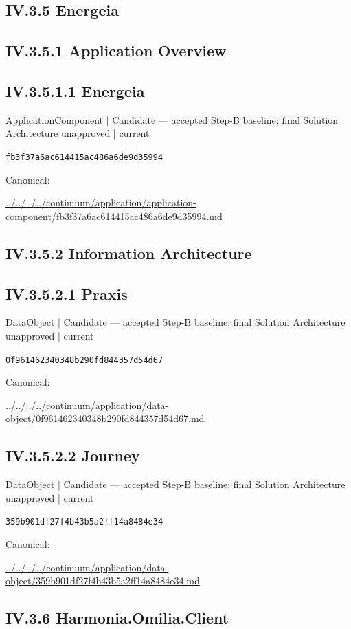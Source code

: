 \documentclass[10pt,a4paper]{article}
\begin{document}
\subsection*{IV.3.5 Energeia}
\subsection*{IV.3.5.1 Application Overview}
\subsection*{IV.3.5.1.1 Energeia}
{\small ApplicationComponent | Candidate — accepted Step-B baseline; final Solution Architecture unapproved | current}\par
\texttt{fb3f37a6ac614415ac486a6de9d35994}\par
Canonical: \par
{\footnotesize\url{../../../../continuum/application/application-component/fb3f37a6ac614415ac486a6de9d35994.md}}\par
\subsection*{IV.3.5.2 Information Architecture}
\subsection*{IV.3.5.2.1 Praxis}
{\small DataObject | Candidate — accepted Step-B baseline; final Solution Architecture unapproved | current}\par
\texttt{0f961462340348b290fd844357d54d67}\par
Canonical: \par
{\footnotesize\url{../../../../continuum/application/data-object/0f961462340348b290fd844357d54d67.md}}\par
\subsection*{IV.3.5.2.2 Journey}
{\small DataObject | Candidate — accepted Step-B baseline; final Solution Architecture unapproved | current}\par
\texttt{359b901df27f4b43b5a2ff14a8484e34}\par
Canonical: \par
{\footnotesize\url{../../../../continuum/application/data-object/359b901df27f4b43b5a2ff14a8484e34.md}}\par
\subsection*{IV.3.6 Harmonia.Omilia.Client}
\end{document}
